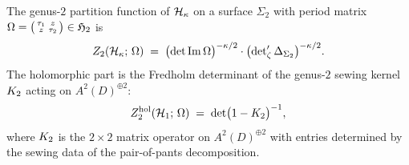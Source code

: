 \begin{theorem}%
\label{thm:thqg-X-genus-2-fredholm}%
%
The genus-$2$ partition function of $\mathcal{H}_\kappa$ on a
surface $\Sigma_2$ with period matrix
$\Omega = \bigl(\begin{smallmatrix}\tau_1 & z \\ z & \tau_2
\end{smallmatrix}\bigr)
\in \mathfrak{H}_2$ is
\begin{equation}\label{eq:thqg-X-genus-2-det}
Z_2(\mathcal{H}_\kappa;\,\Omega)
\;=\;
\bigl(\det\operatorname{Im}\Omega\bigr)^{-\kappa/2}
\cdot
\bigl(\det\nolimits'_\zeta\Delta_{\Sigma_2}\bigr)^{-\kappa/2}.
\end{equation}
The holomorphic part is the Fredholm determinant of the
genus-$2$ sewing kernel $K_2$ acting on $A^2(D)^{\oplus 2}$:
\begin{equation}\label{eq:thqg-X-genus-2-hol}
Z_2^{\mathrm{hol}}(\mathcal{H}_1;\,\Omega)
\;=\;
\det\bigl(1 - K_2\bigr)^{-1},
\end{equation}
where $K_2$ is the $2 \times 2$ matrix operator on
$A^2(D)^{\oplus 2}$ with entries determined by the sewing data
of the pair-of-pants decomposition.
\end{theorem}

